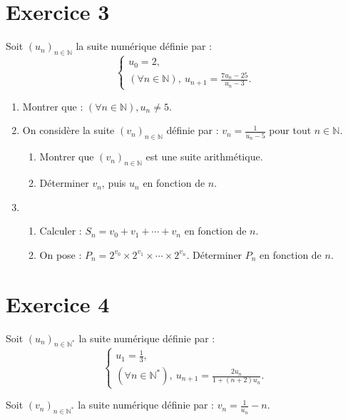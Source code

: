 \documentclass[12pt]{article}
\begin{document}
\section*{Exercice 3}

Soit \((u_n)_{n \in \mathbb{N}}\) la suite numérique définie par :
\[
\begin{cases}
u_0 = 2, \\
(\forall n \in \mathbb{N}), \ u_{n+1} = \frac{7u_n - 25}{u_n - 3}.
\end{cases}
\]

\begin{enumerate}
    \item Montrer que : \((\forall n \in \mathbb{N}), u_n \neq 5\).

    \item On considère la suite \((v_n)_{n \in \mathbb{N}}\) définie par : \(v_n = \frac{1}{u_n - 5}\) pour tout \(n \in \mathbb{N}\).
    \begin{enumerate}
        \item Montrer que \((v_n)_{n \in \mathbb{N}}\) est une suite arithmétique.
        \item Déterminer \(v_n\), puis \(u_n\) en fonction de \(n\).
    \end{enumerate}

    \item 
    \begin{enumerate}
        \item Calculer : \(S_n = v_0 + v_1 + \cdots + v_n\) en fonction de \(n\).
        \item On pose : \(P_n = 2^{v_0} \times 2^{v_1} \times \cdots \times 2^{v_n}\). Déterminer \(P_n\) en fonction de \(n\).
    \end{enumerate}
\end{enumerate}

\section*{Exercice 4}

Soit \((u_n)_{n \in \mathbb{N}^*}\) la suite numérique définie par :
\[
\begin{cases}
u_1 = \frac{1}{3}, \\
(\forall n \in \mathbb{N}^*), \ u_{n+1} = \frac{2u_n}{1 + (n+2)u_n}.
\end{cases}
\]

Soit \((v_n)_{n \in \mathbb{N}^*}\) la suite numérique définie par : \(v_n = \frac{1}{u_n} - n\).
\end{document}
